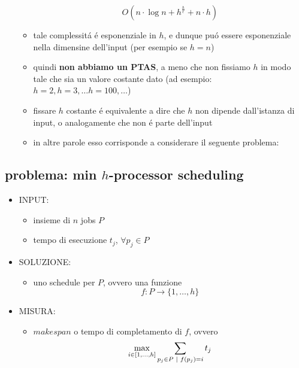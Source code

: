 \begin{flushleft}
\begin{itemize}
\begin{itemize}
				$$O(n\cdot\log n+h^\frac{h}{\epsilon}+n\cdot h)$$
			\item tale complessit\'a \'e esponenziale in $h$, e dunque pu\'o essere esponenziale nella dimensine dell'input (per esempio se $h=n$)
			\item quindi \textbf{non abbiamo un PTAS}, a meno che non fissiamo $h$ in modo tale che sia un valore costante dato (ad esempio: $h=2,h=3,\ldots h=100,\ldots$)
			\item fissare $h$ costante \'e equivalente a dire che $h$ non dipende dall'istanza di input, o analogamente che non \'e parte dell'input
			\item in altre parole esso corrisponde a considerare il seguente problema:
		\end{itemize}
	\end{itemize}
\end{flushleft}


\subsection*{problema: min $h$-processor scheduling}
\begin{flushleft}
	\begin{itemize}
		\item INPUT:
		\begin{itemize}
			\item insieme di $n$ jobs $P$
			\item tempo di esecuzione $t_j$, $\forall p_j\in P$
		\end{itemize}
		\item SOLUZIONE:
		\begin{itemize}
			\item uno schedule per $P$, ovvero una funzione
				$$f:P\rightarrow\{1,\ldots,h\}$$
		\end{itemize}
		\item MISURA:
		\begin{itemize}
			\item $makespan$ o tempo di completamento di $f$, ovvero
				$$\max_{i\in[1,\ldots,h]}\sum_{p_j\in P\hspace{0.1cm}\vert\hspace{0.1cm}f(p_j)=i}t_j$$
		\end{itemize}
	\end{itemize}
\end{flushleft}

